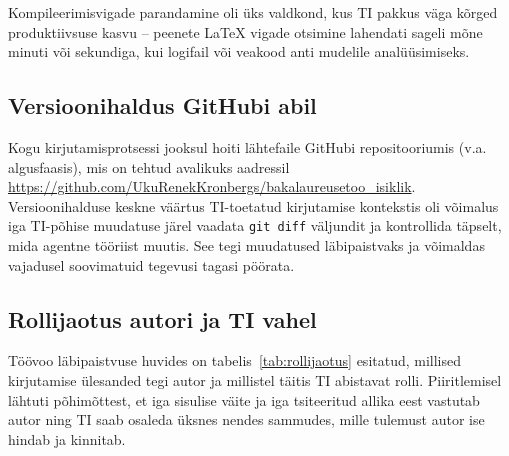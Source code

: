 Kompileerimisvigade parandamine oli üks valdkond, kus TI pakkus väga kõrged produktiivsuse kasvu -- peenete \LaTeX{} vigade otsimine lahendati sageli mõne minuti või sekundiga, kui logifail või veakood anti mudelile analüüsimiseks.

\subsection{Versioonihaldus GitHubi abil} \label{subsec:git}

Kogu kirjutamisprotsessi jooksul hoiti lähtefaile GitHubi repositooriumis (v.a. algusfaasis), mis on tehtud avalikuks aadressil \url{https://github.com/UkuRenekKronbergs/bakalaureusetoo_isiklik}. Versioonihalduse keskne väärtus TI-toetatud kirjutamise kontekstis oli võimalus iga TI-põhise muudatuse järel vaadata \texttt{git diff} väljundit ja kontrollida täpselt, mida agentne tööriist muutis. See tegi muudatused läbipaistvaks ja võimaldas vajadusel soovimatuid tegevusi tagasi pöörata.

\subsection{Rollijaotus autori ja TI vahel} \label{subsec:rollijaotus}

Töövoo läbipaistvuse huvides on tabelis~\ref{tab:rollijaotus} esitatud, millised kirjutamise ülesanded tegi autor ja millistel täitis TI abistavat rolli. Piiritlemisel lähtuti põhimõttest, et iga sisulise väite ja iga tsiteeritud allika eest vastutab autor ning TI saab osaleda üksnes nendes sammudes, mille tulemust autor ise hindab ja kinnitab.

